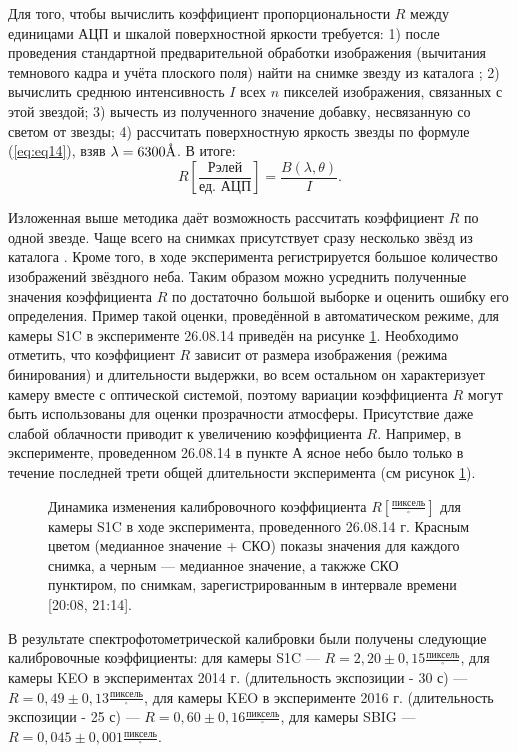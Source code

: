 \documentclass[12pt,a4paper]{article}
\newcommand{\angstrom}{\textup{\AA}}
\begin{document}
Для того, чтобы вычислить коэффициент пропорциональности $R$ между единицами АЦП и шкалой поверхностной яркости требуется: 1) после проведения стандартной предварительной обработки изображения (вычитания темнового кадра и учёта плоского поля) найти на снимке звезду из каталога \cite{Kharitonov1978}; 2) вычислить среднюю интенсивность $I$ всех $n$ пикселей изображения, связанных с этой звездой; 3) вычесть из полученного значение добавку, несвязанную со светом от звезды; 4) рассчитать поверхностную яркость звезды по формуле (\ref{eq:eq14}), взяв $\lambda = 6300\angstrom$. В итоге:
\begin{equation}\label{eq:eq15}
R [\frac{\text{Рэлей}}{\text{ед. АЦП}}]=\frac{B(\lambda,\theta)}{I}.
\end{equation}

Изложенная выше методика даёт возможность рассчитать коэффициент $R$ по одной звезде. Чаще всего на снимках присутствует сразу несколько звёзд из каталога \cite{Kharitonov1978}. Кроме того, в ходе эксперимента регистрируется большое количество изображений звёздного неба. Таким образом можно усреднить полученные значения коэффициента $R$ по достаточно большой выборке и оценить ошибку его определения. Пример такой оценки, проведённой в автоматическом режиме, для камеры S1C в эксперименте 26.08.14 приведён на рисунке \ref{fig:fig3}. Необходимо отметить, что коэффициент $R$ зависит от размера изображения (режима бинирования) и длительности выдержки, во всем остальном он характеризует камеру вместе с оптической системой, поэтому вариации коэффициента $R$ могут быть использованы для оценки прозрачности атмосферы. Присутствие даже слабой облачности приводит к увеличению коэффициента $R$. Например, в эксперименте, проведенном 26.08.14 в пункте А ясное небо было только в течение последней трети общей длительности эксперимента (см рисунок \ref{fig:fig3}).

\begin{figure}[h]
	\caption{Динамика изменения калибровочного коэффициента $R [\frac{\text{пиксель}}{^{\circ}}]$ для камеры S1C в ходе эксперимента, проведенного 26.08.14 г. Красным цветом (медианное значение + СКО) показы значения для каждого снимка, а черным --- медианное значение, а такжже СКО пунктиром, по снимкам, зарегистрированным в интервале времени [20:08, 21:14].}
	\label{fig:fig3}
\end{figure}

В результате спектрофотометрической калибровки были получены следующие калибровочные коэффициенты: для камеры S1C --- $R = 2,20 \pm 0,15 \frac{\text{пиксель}}{^{\circ}}$, для камеры KEO в экспериментах 2014 г. (длительность экспозиции - 30 с) --- $R = 0,49 \pm 0,13 \frac{\text{пиксель}}{^{\circ}}$, для камеры KEO в эксперименте 2016 г. (длительность экспозиции - 25 с) --- $R = 0,60 \pm 0,16 \frac{\text{пиксель}}{^{\circ}}$, для камеры SBIG --- $R = 0,045 \pm 0,001\frac{\text{пиксель}}{^{\circ}}$.
\end{document}
